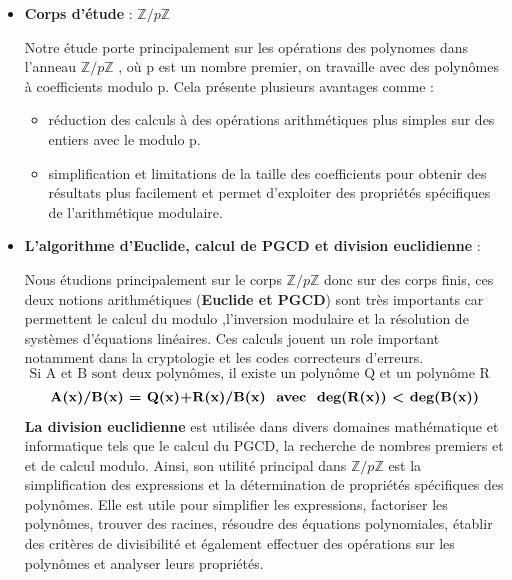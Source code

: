 \documentclass[a4paper]{article}
\begin{document}
\begin{itemize}[label=$\star$]
 \item \textbf{Corps d'étude} : ${\mathbb{Z}/p \mathbb{Z}}$
\newline
 
Notre étude porte principalement sur les opérations des polynomes dans l'anneau ${\mathbb{Z}/p \mathbb{Z}}$ , où p est un nombre premier, on travaille avec des polynômes à coefficients modulo p. Cela présente plusieurs avantages comme :
	\begin{itemize}

  		\item réduction des calculs à des opérations arithmétiques plus simples sur des entiers avec le modulo p.
  		\item simplification et limitations de la taille des coefficients pour obtenir des résultats plus facilement et permet d'exploiter des propriétés spécifiques de l'arithmétique modulaire.
  
	\end{itemize}
	
 \item \textbf{L'algorithme d'Euclide, calcul de PGCD et division euclidienne} :
 
 \bigskip
 
Nous étudions principalement sur le corps ${\mathbb{Z}/p \mathbb{Z}}$ donc sur des corps finis, ces deux notions arithmétiques (\textbf{Euclide et PGCD}) sont très importants car permettent le calcul du modulo ,l'inversion modulaire et la résolution de systèmes d'équations linéaires. Ces calculs jouent un role important notamment dans la cryptologie et les codes correcteurs d'erreurs.
\[
\text{ Si A et B sont deux polynômes, il existe un polynôme Q et un polynôme R tels que }\]  \[ \textbf{A(x)/B(x) = Q(x)+R(x)/B(x) \text{ avec } deg(R(x)) < deg(B(x))}
\]
\textbf{La division euclidienne} est utilisée dans divers domaines mathématique et informatique tels que le calcul du PGCD, la recherche de nombres premiers et et de calcul modulo. Ainsi, son utilité principal dans ${\mathbb{Z}/p \mathbb{Z}}$ est la simplification des expressions et la détermination de propriétés spécifiques des polynômes. Elle est utile pour simplifier les expressions, factoriser les polynômes, trouver des racines, résoudre des équations polynomiales, établir des critères de divisibilité et également effectuer des opérations sur les polynômes et analyser leurs propriétés.
\end{itemize}
\end{document}
